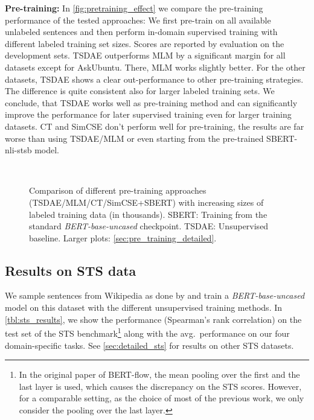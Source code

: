 \documentclass[11pt]{article}
\begin{document}
\textbf{Pre-training:} In \autoref{fig:pretraining_effect} we compare the pre-training performance of the tested approaches: We first pre-train on all available unlabeled sentences and then perform in-domain supervised training with different labeled training set sizes. Scores are reported by evaluation on the development sets. TSDAE outperforms MLM by a significant margin for all datasets except for AskUbuntu. There, MLM works slightly better. For the other datasets, TSDAE shows a clear out-performance to other pre-training strategies. The difference is quite consistent also for larger labeled training sets. We conclude, that TSDAE works well as pre-training method and can significantly improve the performance for later supervised training even for larger training datasets. CT and SimCSE don't perform well for pre-training, the results are far worse than using TSDAE/MLM or even starting from the pre-trained SBERT-nli-stsb model. 



\begin{figure}[t]
  \centering
  \\
  \caption{Comparison of different pre-training approaches (TSDAE/MLM/CT/SimCSE+SBERT) with increasing sizes of labeled training data (in thousands). SBERT: Training from the standard \textit{BERT-base-uncased} checkpoint. TSDAE: Unsupervised baseline. Larger plots: \autoref{sec:pre_training_detailed}.}
  \label{fig:pretraining_effect}
\end{figure}

\subsection{Results on STS data}\label{sec:STS_results}

We sample sentences from Wikipedia as done by \citet{carlsson2021semantic} and train a \textit{BERT-base-uncased} model on this dataset with the different unsupervised training methods. In \autoref{tbl:sts_results}, we show the performance (Spearman's rank correlation) on the test set of the STS benchmark\footnote{In the original paper of BERT-flow, the mean pooling over the first and the last layer is used, which causes the discrepancy on the STS scores. However, for a comparable setting, as the choice of most of the previous work, we only consider the pooling over the last layer.} along with the avg.\ performance on our four domain-specific tasks. See \autoref{sec:detailed_sts} for results on other STS datasets.
\end{document}
